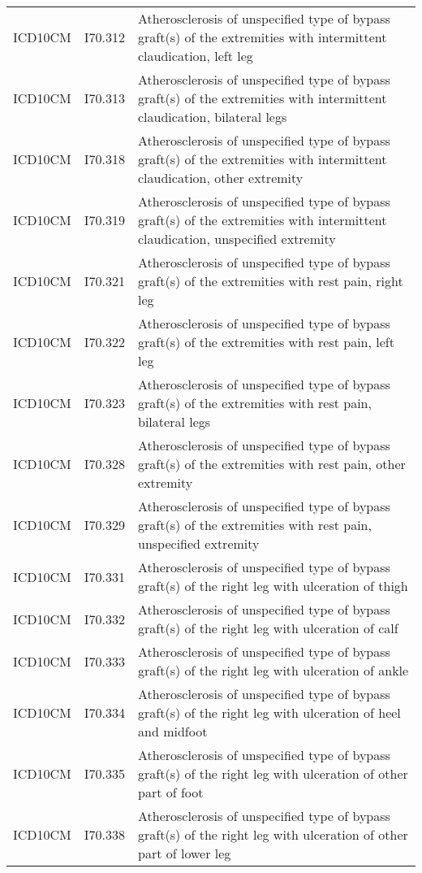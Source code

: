 \begin{longtable}{p{}p{}p{}}
  ICD10CM & I70.312 & Atherosclerosis of unspecified type of bypass graft(s) of the extremities with intermittent claudication, left leg \\ 
  ICD10CM & I70.313 & Atherosclerosis of unspecified type of bypass graft(s) of the extremities with intermittent claudication, bilateral legs \\ 
  ICD10CM & I70.318 & Atherosclerosis of unspecified type of bypass graft(s) of the extremities with intermittent claudication, other extremity \\ 
  ICD10CM & I70.319 & Atherosclerosis of unspecified type of bypass graft(s) of the extremities with intermittent claudication, unspecified extremity \\ 
  ICD10CM & I70.321 & Atherosclerosis of unspecified type of bypass graft(s) of the extremities with rest pain, right leg \\ 
  ICD10CM & I70.322 & Atherosclerosis of unspecified type of bypass graft(s) of the extremities with rest pain, left leg \\ 
  ICD10CM & I70.323 & Atherosclerosis of unspecified type of bypass graft(s) of the extremities with rest pain, bilateral legs \\ 
  ICD10CM & I70.328 & Atherosclerosis of unspecified type of bypass graft(s) of the extremities with rest pain, other extremity \\ 
  ICD10CM & I70.329 & Atherosclerosis of unspecified type of bypass graft(s) of the extremities with rest pain, unspecified extremity \\ 
  ICD10CM & I70.331 & Atherosclerosis of unspecified type of bypass graft(s) of the right leg with ulceration of thigh \\ 
  ICD10CM & I70.332 & Atherosclerosis of unspecified type of bypass graft(s) of the right leg with ulceration of calf \\ 
  ICD10CM & I70.333 & Atherosclerosis of unspecified type of bypass graft(s) of the right leg with ulceration of ankle \\ 
  ICD10CM & I70.334 & Atherosclerosis of unspecified type of bypass graft(s) of the right leg with ulceration of heel and midfoot \\ 
  ICD10CM & I70.335 & Atherosclerosis of unspecified type of bypass graft(s) of the right leg with ulceration of other part of foot \\ 
  ICD10CM & I70.338 & Atherosclerosis of unspecified type of bypass graft(s) of the right leg with ulceration of other part of lower leg \\ 

\end{longtable}
